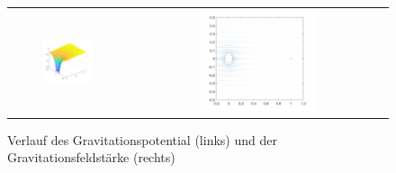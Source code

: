 \documentclass[11pt,a4paper]{article}
\begin{document}
  \begin{figure}
\begin{tabular}{cc}
  \includegraphics[width=0.45\textwidth]{bild1} &  
  \includegraphics[width=0.45\textwidth]{bild2} \\
  
  \end{tabular}
\caption{Verlauf des Gravitationspotential (links) und der Gravitationsfeldst\"arke (rechts)}
  \end{figure}
  
\end{document}
